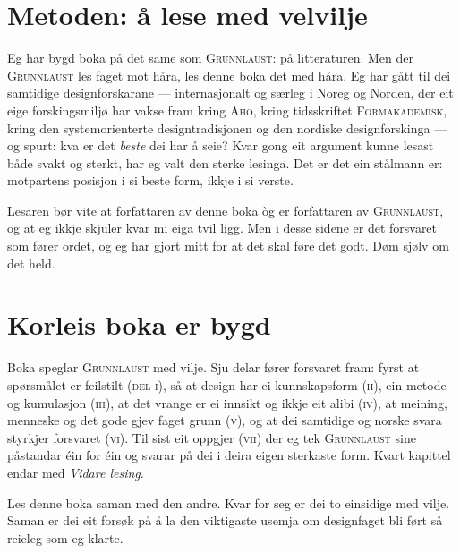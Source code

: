 \section{Metoden: å lese med velvilje}

Eg har bygd boka på det same som \textsc{Grunnlaust}: på litteraturen. Men der \textsc{Grunnlaust} les faget mot håra, les denne boka det med håra. Eg har gått til dei samtidige designforskarane — internasjonalt og særleg i Noreg og Norden, der eit eige forskingsmiljø har vakse fram kring \textsc{Aho}, kring tidsskriftet \textsc{Formakademisk}, kring den systemorienterte designtradisjonen og den nordiske designforskinga — og spurt: kva er det \emph{beste} dei har å seie? Kvar gong eit argument kunne lesast både svakt og sterkt, har eg valt den sterke lesinga. Det er det ein stålmann er: motpartens posisjon i si beste form, ikkje i si verste.

Lesaren bør vite at forfattaren av denne boka òg er forfattaren av \textsc{Grunnlaust}, og at eg ikkje skjuler kvar mi eiga tvil ligg. Men i desse sidene er det forsvaret som fører ordet, og eg har gjort mitt for at det skal føre det godt. Døm sjølv om det held.

\section{Korleis boka er bygd}

Boka speglar \textsc{Grunnlaust} med vilje. Sju delar fører forsvaret fram: fyrst at spørsmålet er feilstilt (\textsc{del i}), så at design har ei kunnskapsform (\textsc{ii}), ein metode og kumulasjon (\textsc{iii}), at det vrange er ei innsikt og ikkje eit alibi (\textsc{iv}), at meining, menneske og det gode gjev faget grunn (\textsc{v}), og at dei samtidige og norske svara styrkjer forsvaret (\textsc{vi}). Til sist eit oppgjer (\textsc{vii}) der eg tek \textsc{Grunnlaust} sine påstandar éin for éin og svarar på dei i deira eigen sterkaste form. Kvart kapittel endar med \emph{Vidare lesing}.

Les denne boka saman med den andre. Kvar for seg er dei to einsidige med vilje. Saman er dei eit forsøk på å la den viktigaste usemja om designfaget bli ført så reieleg som eg klarte.

